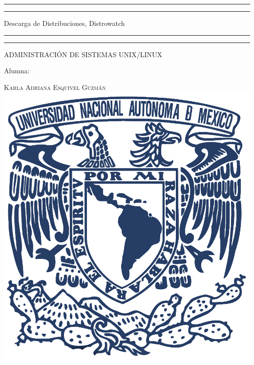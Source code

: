 \documentclass[a4paper, 11pt, oneside]{article}
\begin{document}
 

\begin{titlepage} 

	\centering 
	
	\scshape 
	
	\vspace*{\baselineskip} 
	
	
	
	\rule{\textwidth}{1.6pt}\vspace*{-\baselineskip}\vspace*{2pt} 
	\rule{\textwidth}{0.4pt} 
	
	\vspace{0.75\baselineskip} 
	
	{\LARGE Descarga de Distribuciones, Distrowatch}	
	\vspace{0.75\baselineskip} 
	
	\rule{\textwidth}{0.4pt}\vspace*{-\baselineskip}\vspace{3.2pt}
	\rule{\textwidth}{1.6pt} 
	
	\vspace{2\baselineskip} 
	

	ADMINISTRACIÓN DE SISTEMAS UNIX/LINUX
	
	\vspace*{3\baselineskip} 
	
	
	
	Alumna:
	
	\vspace{0.5\baselineskip} 
	
	{\scshape\Large Karla Adriana Esquivel Guzmán \\} 
	\vspace{0.5\baselineskip} 
	\vfill
	\includegraphics{unam.jpg}
	

\end{titlepage}
\end{document}
